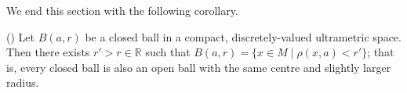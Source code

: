 


We end this section with the following corollary.\\
\begin{corollary}
(\cite{ar}) Let $B(a, r)$ be a closed ball in a compact, discretely-valued ultrametric space. Then there exists $ r' > r \in \mathbb{R}$ such that $B(a, r) = \{x \in M \mid \rho(x,a) < r'\} $; that is, every closed ball is also an open ball with the same centre and  slightly larger radius.
\end{corollary}




